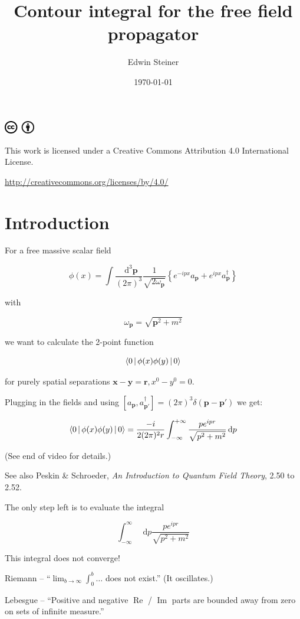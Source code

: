 \documentclass[aspectratio=169]{beamer}
\title{Contour integral for the free field propagator}
\author{Edwin Steiner}
\date{\today}
\newcommand{\sqrtpm}{\sqrt{p^2 + m^2}}
\newcommand{\integrand}{\frac{p e^{ipr}}{\sqrt{p^2 + m^2}}}
\newcommand{\vp}{\mathbf{p}}
\newcommand{\vx}{\mathbf{x}}
\newcommand{\vy}{\mathbf{y}}
\newcommand{\vr}{\mathbf{r}}
\newcommand{\vpp}{\mathbf{p}'}
\newcommand{\omvp}{\omega_{\vp}}
\newcommand{\ap}{a_{\vp}}
\newcommand{\adp}{a^\dagger_{\vp}}
\newcommand{\adpp}{a^\dagger_{\vpp}}
\newcommand{\diffop}{\mathop{}\!\mathrm{d}}
\newcommand{\dip}{\diffop p}
\newcommand{\intpthree}{\int \frac{\diffop^3\vp}{(2\pi)^3}}
\newcommand{\com}[2]{[{#1},{#2}]}
\newcommand{\phixy}{\Braket{0|\phi(x)\phi(y)|0}}
\newcommand{\intii}{\int_{-\infty}^{+\infty}}
\renewcommand\Re{\operatorname{Re}}
\renewcommand\Im{\operatorname{Im}}
\begin{document}

\begin{frame}
\titlepage
\begin{tiny}
\includegraphics[width=0.1\textwidth]{CC_BY.png}

\medskip
This work is licensed under a Creative Commons Attribution 4.0 International License.

\url{http://creativecommons.org/licenses/by/4.0/}
\end{tiny}
\end{frame}


\section{Introduction}


\begin{frame}
For a free massive \alert{scalar field}

\pause
$$\phi(x) = \intpthree \frac{1}{\sqrt{2\omvp}} \left\{ e^{-ipx} \ap + e^{ipx} \adp \right\}$$

with

$$\omvp = \sqrt{\vp^2 + m^2}$$

\pause
we want to calculate the \alert{2-point function}

\pause
$$\phixy$$

\pause
\medskip
for \alert{purely spatial} separations $\vx - \vy = \vr, x^0 - y^0 = 0$.
\end{frame}


\begin{frame}
Plugging in the fields and using $\com{\ap}{\adpp} = (2\pi)^3 \delta(\vp - \vpp)$ we get:

\pause
$$\phixy = \frac{-i}{2(2\pi)^2 r} \intii \frac{p e^{ipr}}{\sqrtpm} \dip$$

\pause
\bigskip
(See end of video for details.)

\pause
\medskip
See also Peskin \& Schroeder, \textit{An Introduction to Quantum Field Theory}, 2.50 to 2.52.
\end{frame}


\begin{frame}
The only step left is to evaluate the integral

\pause
$$\int_{-\infty}^{\infty} \dip \integrand$$

\pause
\medskip
\alert{This integral does not converge!}

\pause
\bigskip
\bigskip
Riemann -- ``$\lim_{b \to \infty} \int_0^b \ldots$ does not exist.'' (It oscillates.)

\pause
\bigskip
Lebesgue -- ``Positive and negative $\Re$ / $\Im$ parts are bounded away from zero on sets of infinite measure.''
\end{frame}
\end{document}
